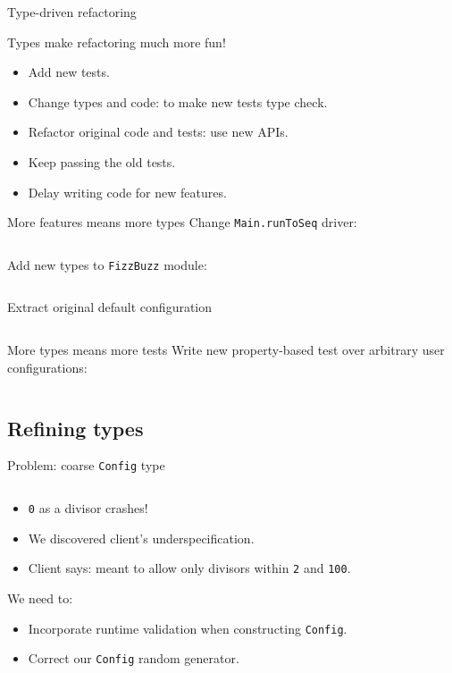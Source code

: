 \begin{frame}{Type-driven refactoring}
  \begin{block}{Types make refactoring much more fun!}
  \begin{itemize}
  \item Add \alert{new} tests.
  \item Change types and code: to make new tests \alert{type check}.
  \item \alert{Refactor} original code and tests: use new APIs.
  \item Keep passing the \alert{old} tests.
  \item Delay writing code for new features.
  \end{itemize}
  \end{block}
\end{frame}

\begin{frame}[fragile]{More features means more types}
  Change \texttt{Main.runToSeq} driver:
  \inputminted[gobble=2]{scala}{Main5.scala}

  Add new types to \texttt{FizzBuzz} module:
  \inputminted[gobble=2]{scala}{FizzBuzz3.scala}
\end{frame}

\begin{frame}[fragile]{Extract original default configuration}
  \inputminted{scala}{Defaults1.scala}
\end{frame}

\begin{frame}[fragile]{More types means more tests}
  Write new property-based test over \alert{arbitrary} user configurations:
  \inputminted[gobble=2]{scala}{FizzBuzzSpec6.scala}
\end{frame}

\subsection{Refining types}

\begin{frame}[fragile]{Problem: coarse \texttt{Config} type}
  \inputminted{console}{testQuick6.console}

  \begin{itemize}
  \item \texttt{0} as a divisor \alert{crashes}!
  \item We discovered client's \alert{underspecification}.
  \item Client says: meant to allow only divisors within \texttt{2} and \texttt{100}.
  \end{itemize}

  We need to:
  \begin{itemize}
  \item Incorporate runtime \alert{validation} when constructing \texttt{Config}.
  \item Correct our \texttt{Config} random generator.
  \end{itemize}
\end{frame}


